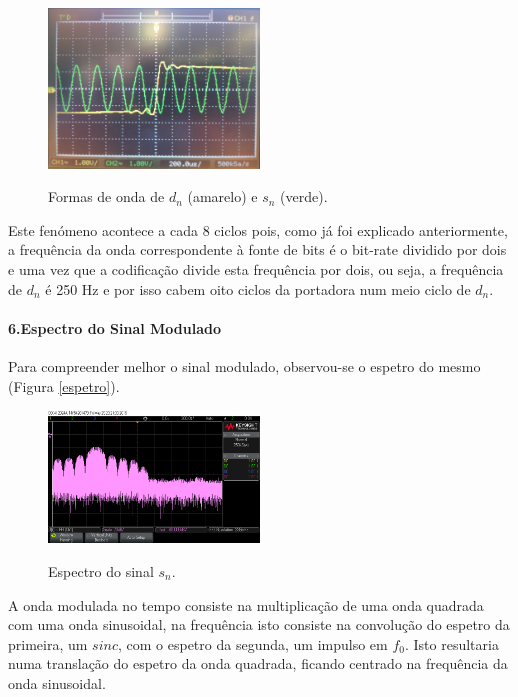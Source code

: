 \documentclass[11pt]{article}
\numberwithin{equation}{section}
\begin{document}
 
 \begin{figure}[H]
 	\centering
 	\includegraphics[width=0.5\textwidth]{./dn_mod}~\\
 	\caption{Formas de onda de $d_n$ (amarelo) e $s_n$ (verde).}
 	\label{dn_mod}
 \end{figure}
 Este fenómeno acontece a cada 8 ciclos pois, como já foi explicado anteriormente, a frequência da onda correspondente à fonte de bits é o bit-rate dividido por dois e uma vez que a codificação divide esta frequência por dois, ou seja, a frequência de $d_n$ é 250 Hz e por isso cabem oito ciclos da portadora num meio ciclo de $d_n$.
 \vspace{2 mm}

\paragraph{6.Espectro do Sinal Modulado} \hspace{0pt}
Para compreender melhor o sinal modulado, observou-se o espetro do mesmo (Figura \ref{espetro}).
\begin{figure}[H]
	\centering
	\includegraphics[width=0.5\textwidth]{./spectrum_sn_0-16k}~\\
	\caption{Espectro do sinal $s_n$.}
	\label{espetrosn}
\end{figure}
A onda modulada no tempo consiste na multiplicação de uma onda quadrada com uma onda sinusoidal, na frequência isto consiste na convolução do espetro da primeira, um $sinc$, com o espetro da segunda, um impulso em $f_0$. Isto resultaria numa translação do espetro da onda quadrada, ficando centrado na frequência da onda sinusoidal.
\end{document}
